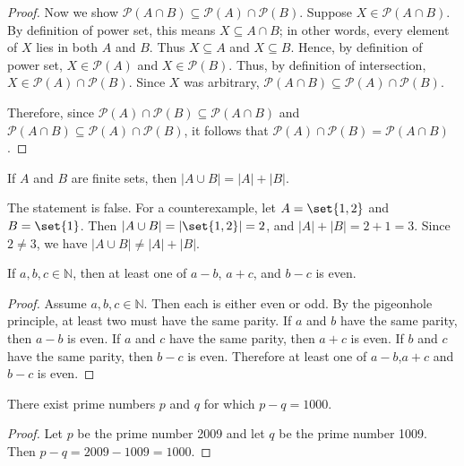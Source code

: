 \documentclass[DIN, pagenumber=false, fontsize=11pt, parskip=half]{scrartcl}
\begin{document}
\begin{problems}
\begin{proof}
        Now we show $\mathcal{P}(A \cap B) \subseteq \mathcal{P}(A) \cap \mathcal{P}(B)$.
        Suppose $X \in \mathcal{P}(A \cap B)$.
        By definition of power set, this means $X \subseteq A \cap B$; in other words, every element of $X$ lies in both $A$ and $B$.
        Thus $X \subseteq A$ and $X \subseteq B$.
        Hence, by definition of power set, $X \in \mathcal{P}(A)$ and $X \in \mathcal{P}(B)$.
        Thus, by definition of intersection, $X \in \mathcal{P}(A) \cap \mathcal{P}(B)$.
        Since $X$ was arbitrary, $\mathcal{P}(A \cap B) \subseteq \mathcal{P}(A) \cap \mathcal{P}(B)$.

        Therefore, since $\mathcal{P}(A) \cap \mathcal{P}(B) \subseteq \mathcal{P}(A \cap B)$ and $\mathcal{P}(A \cap B) \subseteq \mathcal{P}(A) \cap \mathcal{P}(B)$, it follows that $\mathcal{P}(A) \cap \mathcal{P}(B) = \mathcal{P}(A \cap B)$.
    \end{proof}

    \problem If $A$ and $B$ are finite sets, then $|A \cup B| = |A| + |B|$.
    \begin{disproof}
        The statement is false.
        For a counterexample, let $A = \set{1,2}$ and $B = \set{1}$.
        Then $|A \cup B| = |\set{1,2}| = 2$, and $|A| + |B| = 2 + 1 = 3$.
        Since $2 \neq 3$, we have $|A \cup B| \neq |A| + |B|$.
    \end{disproof}

    \problem If $a,b,c \in \mathbb{N}$, then at least one of $a-b$, $a+c$, and $b-c$ is even.
    \begin{proof}
        Assume $a,b,c \in \mathbb{N}$. Then each is either even or odd.
        By the pigeonhole principle, at least two must have the same parity.
        If $a$ and $b$ have the same parity, then $a-b$ is even.
        If $a$ and $c$ have the same parity, then $a+c$ is even.
        If $b$ and $c$ have the same parity, then $b-c$ is even.
        Therefore at least one of $a-b$,$a+c$ and $b-c$ is even.
    \end{proof}

    \problem There exist prime numbers $p$ and $q$ for which $p-q=1000$.
    \begin{proof}
        Let $p$ be the prime number 2009 and let $q$ be the prime number 1009. Then $p-q = 2009-1009 = 1000$.
    \end{proof}

\end{problems}
\end{document}
